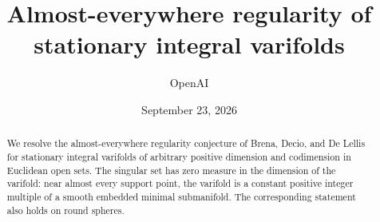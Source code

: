 \documentclass[11pt]{article}
\title{Almost-everywhere regularity of stationary integral varifolds}
\author{OpenAI}
\date{September 23, 2026}
\theoremstyle{definition}
\numberwithin{equation}{section}
\begin{document}
\maketitle
\begin{abstract}
We resolve the almost-everywhere regularity conjecture of Brena, Decio, and
De Lellis for stationary integral varifolds of arbitrary positive dimension
and codimension in Euclidean open sets. The singular set has zero measure in
the dimension of the varifold: near almost every support point, the varifold
is a constant positive integer multiple of a smooth embedded minimal
submanifold. The corresponding statement also holds on round spheres.
\end{abstract}
\begingroup
\small
\tableofcontents
\endgroup
\clearpage











\end{document}
